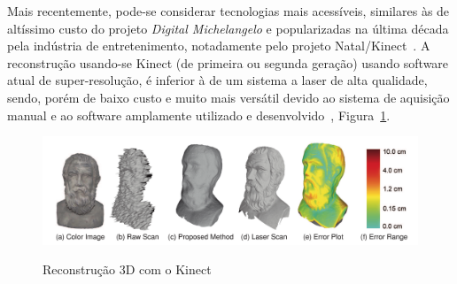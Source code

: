 Mais recentemente, pode-se considerar tecnologias mais acessíveis, similares às
de altíssimo custo do projeto \emph{Digital Michelangelo} e popularizadas na última
década pela indústria de entretenimento, notadamente pelo projeto
Natal/Kinect~\cite{smisek20133d,wang2015research}. A reconstrução usando-se Kinect (de
primeira ou segunda geração) usando software atual de super-resolução, é
inferior à de um sistema a laser de alta qualidade, sendo, porém de baixo custo
e muito mais versátil devido ao sistema de aquisição manual e ao software
amplamente utilizado e desenvolvido~\cite{wang2015research},
Figura~\ref{fig:rec3d:comparacao}.


\begin{figure}[!h]
	\centering
	\caption{Reconstrução 3D com o Kinect}
	\includegraphics[width=1\linewidth]{figs/kinect-vs-usual.png}
  \label{fig:rec3d:comparacao}
\end{figure}

\newpage

